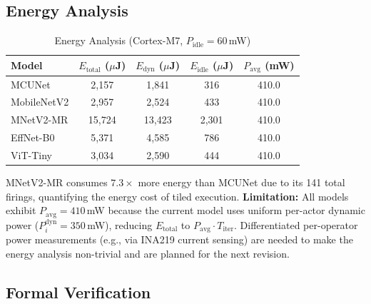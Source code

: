 \documentclass[journal]{IEEEtran}
\begin{document}
\subsection{Energy Analysis}

\begin{table}[htbp]
\centering
\caption{Energy Analysis (Cortex-M7, $P_{\mathrm{idle}} = 60$\,mW)}
\label{tab:energy}
\begin{tabular}{@{}lcccc@{}}
\toprule
Model & $E_{\mathrm{total}}$ ($\mu$J) & $E_{\mathrm{dyn}}$ ($\mu$J) & $E_{\mathrm{idle}}$ ($\mu$J) & $P_{\mathrm{avg}}$ (mW) \\
\midrule
MCUNet      & 2{,}157  & 1{,}841  & 316    & 410.0 \\
MobileNetV2 & 2{,}957  & 2{,}524  & 433    & 410.0 \\
MNetV2-MR   & 15{,}724 & 13{,}423 & 2{,}301 & 410.0 \\
EffNet-B0   & 5{,}371  & 4{,}585  & 786    & 410.0 \\
ViT-Tiny    & 3{,}034  & 2{,}590  & 444    & 410.0 \\
\bottomrule
\end{tabular}
\end{table}

MNetV2-MR consumes $7.3\times$ more energy than MCUNet due to its 141 total firings, quantifying the energy cost of tiled execution.
\textbf{Limitation:} All models exhibit $P_{\mathrm{avg}} = 410$\,mW because the current model uses uniform per-actor dynamic power ($P_i^{\mathrm{dyn}} = 350$\,mW), reducing $E_{\mathrm{total}}$ to $P_{\mathrm{avg}} \cdot T_{\mathrm{iter}}$. Differentiated per-operator power measurements (e.g., via INA219 current sensing) are needed to make the energy analysis non-trivial and are planned for the next revision.

\subsection{Formal Verification}
\end{document}
